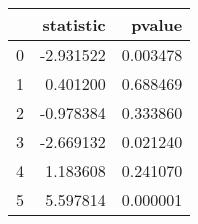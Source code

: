 \begin{tabular}{lrr}
\toprule
{} &  statistic &    pvalue \\
\midrule
0 &  -2.931522 &  0.003478 \\
1 &   0.401200 &  0.688469 \\
2 &  -0.978384 &  0.333860 \\
3 &  -2.669132 &  0.021240 \\
4 &   1.183608 &  0.241070 \\
5 &   5.597814 &  0.000001 \\
\bottomrule
\end{tabular}
